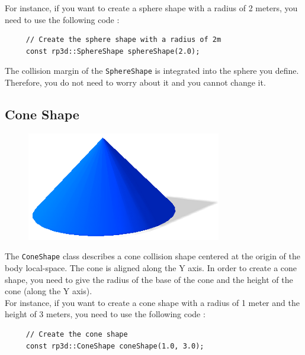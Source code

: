 \documentclass[a4paper,12pt]{article}
\begin{document}
    For instance, if you want to create a sphere shape with a radius of 2 meters, you need to use the following code : \\

    \begin{lstlisting}
     // Create the sphere shape with a radius of 2m
     const rp3d::SphereShape sphereShape(2.0);
  \end{lstlisting}

    \vspace{0.6cm}

    The collision margin of the \texttt{SphereShape} is integrated into the sphere you define. Therefore, you do not need to worry about it and you cannot change it.

    \subsection{Cone Shape}

    \begin{figure}[h]
        \centering
        \includegraphics{coneshape.png}
        \label{fig:coneshape}
    \end{figure}

    The \texttt{ConeShape} class describes a cone collision shape centered at the origin of the body local-space. The cone is aligned along the Y axis.
    In order to create a cone shape, you need to give the radius of the base of the cone and the height of the cone (along the Y axis). \\

    For instance, if you want to create a cone shape with a radius of 1 meter and the height of 3 meters, you need to use the following code : \\

    \begin{lstlisting}
     // Create the cone shape
     const rp3d::ConeShape coneShape(1.0, 3.0);
  \end{lstlisting}

    \vspace{0.6cm}
\end{document}
